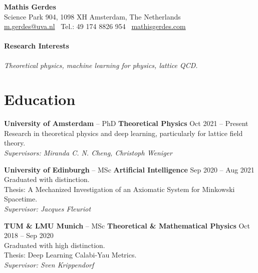 \documentclass[11pt]{article}
\newcommand{\dateright}[1]{\hfill{\small\color{accentblue} #1}}
\begin{document}
\begin{center}
    {\LARGE \textbf{Mathis Gerdes}} \\
    \vspace{0.15cm}
    Science Park 904, 1098 XH Amsterdam, The Netherlands \\
    \href{mailto:m.gerdes@uva.nl}{m.gerdes@uva.nl} \textbullet\
    Tel.: \raisebox{0.2\height}{\footnotesize +}49 174 8826 954 \textbullet\
    \href{http://www.mathisgerdes.com}{mathisgerdes.com}
\end{center}

\vspace{0.3cm}

\paragraph{Research Interests}
\textit{Theoretical physics, machine learning for physics, lattice QCD.}

\section*{Education}
\noindent
\textbf{University of Amsterdam} -- PhD \textbf{Theoretical Physics} \dateright{Oct 2021 -- Present} \\
Research in theoretical physics and deep learning, particularly for lattice field theory. \\
\textit{Supervisors: Miranda C. N. Cheng, Christoph Weniger}

\vspace{0.2cm}

\noindent
\textbf{University of Edinburgh} -- MSc \textbf{Artificial Intelligence} \dateright{Sep 2020 -- Aug 2021} \\
Graduated with distinction. \\
Thesis: A Mechanized Investigation of an Axiomatic System for Minkowski Spacetime. \\
\textit{Supervisor: Jacques Fleuriot}

\vspace{0.2cm}

\noindent
\textbf{TUM \& LMU Munich} -- MSc \textbf{Theoretical \& Mathematical Physics} \dateright{Oct 2018 -- Sep 2020} \\
Graduated with high distinction. \\
Thesis: Deep Learning Calabi-Yau Metrics. \\
\textit{Supervisor: Sven Krippendorf}
\end{document}
